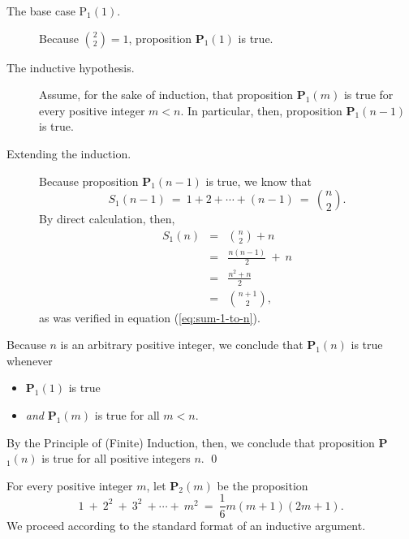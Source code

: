 \begin{description}
\item[{\sf The base case P$_1(1)$}.]
%
Because ${\displaystyle {2 \choose 2}} = 1$, proposition {\bf P}$_1(1)$
is true.

\item[{\sf The inductive hypothesis}.]
%
Assume, for the sake of induction, that proposition {\bf P}$_1(m)$ is
true for every positive integer $m < n$.  In particular, then,
proposition {\bf P}$_1(n-1)$ is true.

\item[{\sf Extending the induction}.]
%
Because proposition {\bf P}$_1(n-1)$ is true, we know that
\[ S_1(n-1) \ = \ 1 + 2 + \cdots + (n-1) \ = \ {n \choose 2}.  \]
By direct calculation, then,
\begin{eqnarray*}
S_1(n) & = & {n \choose 2} + n \\
  & = & \frac{n(n-1)}{2}  \ + \ n \\ 
  & = & \frac{n^2 + n}{2} \\
  & = & {{n+1} \choose 2},
\end{eqnarray*}
as was verified in equation (\ref{eq:sum-1-to-n}).
\end{description}
Because $n$ is an arbitrary positive integer, we conclude that
{\bf P}$_1(n)$ is true whenever
\begin{itemize}
\item
{\bf P}$_1(1)$ is true
\item
{\em and}
{\bf P}$_1(m)$ is true for all $m < n$.
\end{itemize}
By the Principle of (Finite) Induction, then, we conclude that
proposition {\bf P}$_1(n)$ is true for all positive integers $n$.
\qed

\bigskip


%
For every positive integer $m$, let {\bf P}$_2(m)$ be the proposition
\[  1 \ + \ 2^2 \ + \ 3^2 \ + \cdots + \ m^2 \ = \ 
\frac{1}{6} m (m+1)(2m+1).
\]
We proceed according to the standard format of an inductive argument.

